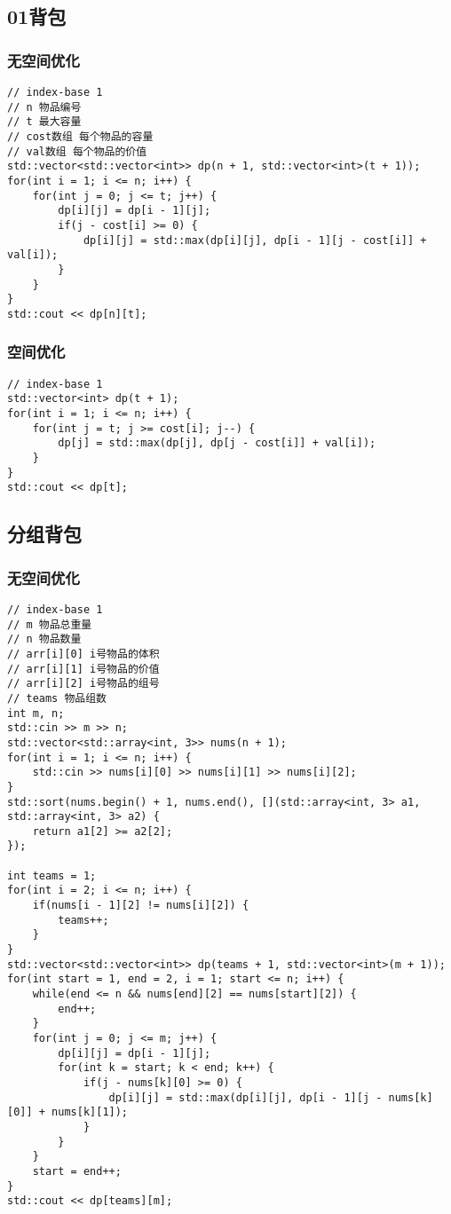 \subsection{01背包}
\subsubsection{无空间优化}
\begin{lstlisting}
// index-base 1
// n 物品编号
// t 最大容量
// cost数组 每个物品的容量
// val数组 每个物品的价值
std::vector<std::vector<int>> dp(n + 1, std::vector<int>(t + 1));
for(int i = 1; i <= n; i++) {
    for(int j = 0; j <= t; j++) {
        dp[i][j] = dp[i - 1][j];
        if(j - cost[i] >= 0) {
            dp[i][j] = std::max(dp[i][j], dp[i - 1][j - cost[i]] + val[i]);
        }
    }
}
std::cout << dp[n][t];
\end{lstlisting}

\subsubsection{空间优化}
\begin{lstlisting}
// index-base 1
std::vector<int> dp(t + 1);
for(int i = 1; i <= n; i++) {
    for(int j = t; j >= cost[i]; j--) {
        dp[j] = std::max(dp[j], dp[j - cost[i]] + val[i]); 
    }
}
std::cout << dp[t];
\end{lstlisting}

\subsection{分组背包}

\subsubsection{无空间优化}
\begin{lstlisting}
// index-base 1
// m 物品总重量
// n 物品数量
// arr[i][0] i号物品的体积
// arr[i][1] i号物品的价值
// arr[i][2] i号物品的组号
// teams 物品组数
int m, n;
std::cin >> m >> n;
std::vector<std::array<int, 3>> nums(n + 1);
for(int i = 1; i <= n; i++) {
    std::cin >> nums[i][0] >> nums[i][1] >> nums[i][2];
}
std::sort(nums.begin() + 1, nums.end(), [](std::array<int, 3> a1, std::array<int, 3> a2) {
    return a1[2] >= a2[2];
});

int teams = 1;
for(int i = 2; i <= n; i++) {
    if(nums[i - 1][2] != nums[i][2]) {
        teams++;
    }
}
std::vector<std::vector<int>> dp(teams + 1, std::vector<int>(m + 1));
for(int start = 1, end = 2, i = 1; start <= n; i++) {
    while(end <= n && nums[end][2] == nums[start][2]) {
        end++;
    }
    for(int j = 0; j <= m; j++) {
        dp[i][j] = dp[i - 1][j];
        for(int k = start; k < end; k++) {
            if(j - nums[k][0] >= 0) {
                dp[i][j] = std::max(dp[i][j], dp[i - 1][j - nums[k][0]] + nums[k][1]);
            }
        }
    }
    start = end++;
}
std::cout << dp[teams][m];
\end{lstlisting}

